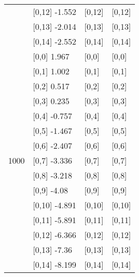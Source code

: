 \begin{table}
\begin{tabular}[t]{llll}
 & {}[0,12] -1.552 & {}[0,12] & {}[0,12]\\
 & {}[0,13] -2.014 & {}[0,13] & {}[0,13]\\
 & {}[0,14] -2.552 & {}[0,14] & {}[0,14]\\
\addlinespace
 & {}[0,0] 1.967 & {}[0,0] & {}[0,0]\\
 & {}[0,1] 1.002 & {}[0,1] & {}[0,1]\\
 & {}[0,2] 0.517 & {}[0,2] & {}[0,2]\\
 & {}[0,3] 0.235 & {}[0,3] & {}[0,3]\\
 & {}[0,4] -0.757 & {}[0,4] & {}[0,4]\\
\addlinespace
 & {}[0,5] -1.467 & {}[0,5] & {}[0,5]\\
 & {}[0,6] -2.407 & {}[0,6] & {}[0,6]\\
1000 & {}[0,7] -3.336 & {}[0,7] & {}[0,7]\\
 & {}[0,8] -3.218 & {}[0,8] & {}[0,8]\\
 & {}[0,9] -4.08 & {}[0,9] & {}[0,9]\\
\addlinespace
 & {}[0,10] -4.891 & {}[0,10] & {}[0,10]\\
 & {}[0,11] -5.891 & {}[0,11] & {}[0,11]\\
 & {}[0,12] -6.366 & {}[0,12] & {}[0,12]\\
 & {}[0,13] -7.36 & {}[0,13] & {}[0,13]\\
 & {}[0,14] -8.199 & {}[0,14] & {}[0,14]\\
\bottomrule
\end{tabular}
\end{table}
